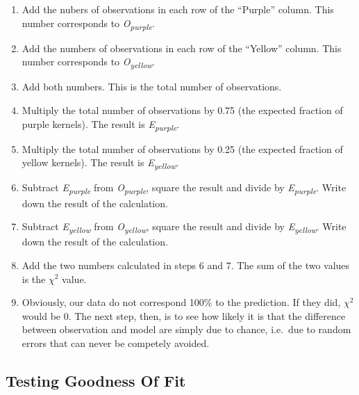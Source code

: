 \documentclass[]{book}
\providecommand{\tightlist}{%
  \setlength{\itemsep}{0pt}\setlength{\parskip}{0pt}}
\begin{document}
\begin{enumerate}
\def\labelenumi{\arabic{enumi}.}
\tightlist
\item
  Add the nubers of observations in each row of the ``Purple'' column. This number corresponds to \emph{O\textsubscript{purple}}.\\
\item
  Add the numbers of observations in each row of the ``Yellow'' column. This number corresponds to \emph{O\textsubscript{yellow}}.\\
\item
  Add both numbers. This is the total number of observations.
\item
  Multiply the total number of observations by 0.75 (the expected fraction of purple kernels). The result is \emph{E\textsubscript{purple}}.
\item
  Multiply the total number of observations by 0.25 (the expected fraction of yellow kernels). The result is \emph{E\textsubscript{yellow}}.
\item
  Subtract \emph{E\textsubscript{purple}} from \emph{O\textsubscript{purple}}, square the result and divide by \emph{E\textsubscript{purple}}. Write down the result of the calculation.
\item
  Subtract \emph{E\textsubscript{yellow}} from \emph{O\textsubscript{yellow}}, square the result and divide by \emph{E\textsubscript{yellow}}. Write down the result of the calculation.
\item
  Add the two numbers calculated in steps 6 and 7. The sum of the two values is the \(\chi^2\) value.
\item
  Obviously, our data do not correspond 100\% to the prediction. If they did, \(\chi^2\) would be 0. The next step, then, is to see how likely it is that the difference between observation and model are simply due to chance, i.e.~due to random errors that can never be competely avoided.
\end{enumerate}

\hypertarget{testing-goodness-of-fit}{%
\subsection{Testing Goodness Of Fit}\label{testing-goodness-of-fit}}
\end{document}
